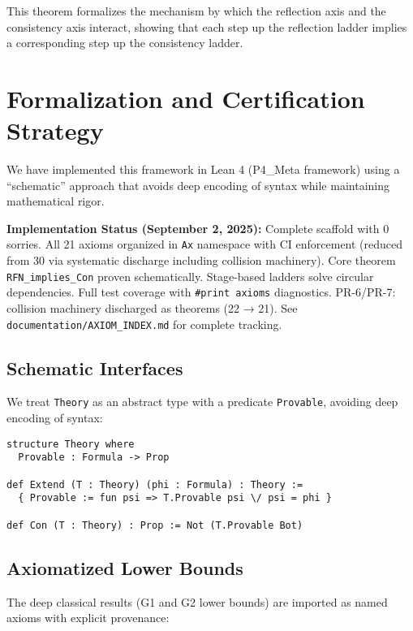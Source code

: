 \documentclass[11pt]{article}
\begin{document}
This theorem formalizes the mechanism by which the reflection axis and the consistency axis interact, showing that each step up the reflection ladder implies a corresponding step up the consistency ladder.

\section{Formalization and Certification Strategy}
We have implemented this framework in Lean 4 (P4\_Meta framework) using a ``schematic'' approach that avoids deep encoding of syntax while maintaining mathematical rigor.

\begin{mdframed}[style=provenance]
\textbf{Implementation Status (September 2, 2025):} Complete scaffold with 0 sorries. All 21 axioms organized in \texttt{Ax} namespace with CI enforcement (reduced from 30 via systematic discharge including collision machinery). Core theorem \texttt{RFN\_implies\_Con} proven schematically. Stage-based ladders solve circular dependencies. Full test coverage with \texttt{\#print axioms} diagnostics. PR-6/PR-7: collision machinery discharged as theorems (22 → 21). See \texttt{documentation/AXIOM\_INDEX.md} for complete tracking.
\end{mdframed}

\subsection{Schematic Interfaces}
We treat \texttt{Theory} as an abstract type with a predicate \texttt{Provable}, avoiding deep encoding of syntax:

\begin{lstlisting}[language=Lean, caption={Core Theory Interface}]
structure Theory where
  Provable : Formula -> Prop

def Extend (T : Theory) (phi : Formula) : Theory :=
  { Provable := fun psi => T.Provable psi \/ psi = phi }

def Con (T : Theory) : Prop := Not (T.Provable Bot)
\end{lstlisting}

\subsection{Axiomatized Lower Bounds}
The deep classical results (G1 and G2 lower bounds) are imported as named axioms with explicit provenance:
\end{document}
